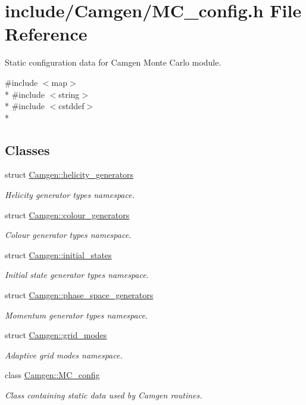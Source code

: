 \hypertarget{a00670}{\section{include/\-Camgen/\-M\-C\-\_\-config.h File Reference}
\label{a00670}
}


Static configuration data for Camgen Monte Carlo module.  


{\ttfamily \#include $<$map$>$}\\*
{\ttfamily \#include $<$string$>$}\\*
{\ttfamily \#include $<$cstddef$>$}\\*
\subsection*{Classes}
\begin{DoxyCompactItemize}
\item 
struct \hyperlink{a00270}{Camgen\-::helicity\-\_\-generators}
\begin{DoxyCompactList}\small\item\em Helicity generator types namespace. \end{DoxyCompactList}\item 
struct \hyperlink{a00088}{Camgen\-::colour\-\_\-generators}
\begin{DoxyCompactList}\small\item\em Colour generator types namespace. \end{DoxyCompactList}\item 
struct \hyperlink{a00308}{Camgen\-::initial\-\_\-states}
\begin{DoxyCompactList}\small\item\em Initial state generator types namespace. \end{DoxyCompactList}\item 
struct \hyperlink{a00417}{Camgen\-::phase\-\_\-space\-\_\-generators}
\begin{DoxyCompactList}\small\item\em Momentum generator types namespace. \end{DoxyCompactList}\item 
struct \hyperlink{a00251}{Camgen\-::grid\-\_\-modes}
\begin{DoxyCompactList}\small\item\em Adaptive grid modes namespace. \end{DoxyCompactList}\item 
class \hyperlink{a00361}{Camgen\-::\-M\-C\-\_\-config}
\begin{DoxyCompactList}\small\item\em Class containing static data used by Camgen routines. \end{DoxyCompactList}\end{DoxyCompactItemize}
